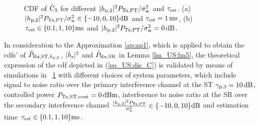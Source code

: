 \begin{figure}[!ht]
{\label{fig_US:CDF_C1_s}}
\hfil
{}
\vspace{0.3cm}
\caption{CDF of $\hat{\text{{C}}}_{\text{3}}$ for different $|h_{\text{p,2}}|^2 P_{\text{Tx,PT}}/\sigma^2_{\text{w}}$ and $\tau_{\text{est}}$. (a) $|h_{\text{p,2}}|^2 P_{\text{Tx,PT}}/\sigma^2_{\text{w}} \in \{-10, 0, 10\} \SI{}{dB}$ and $\tau_{\text{est}} = \SI{1}{ms}$, (b) $\tau_{\text{est}} \in \{0.1, 1, 10\} \SI{}{ms}$ and $|h_{\text{p,2}}|^2 P_{\text{Tx,PT}}/\sigma^2_{\text{w}} = \SI{0}{dB}$.}%
\label{fig_US:CDF_eca}
\vspace{-0.5cm}
\end{figure}
In consideration to the Approximation \ref{ap:ap1}, which is applied to obtain the cdfs' of $\hat{P}_{\text{Rx,ST,$h_{\text{p,3}}$}}$, $|\hat{h}_{\text{s}}|^2$ and $\hat{P}_{\text{Rx,SR}}$ in Lemma \ref{lm_US:lm5}, the theoretical expression of the cdf depicted in (\ref{eq_US:dis_C}) is validated by means of simulations in \figurename~\ref{fig_US:CDF_eca} with different choices of system parameters, which include signal to noise ratio over the primary interference channel at the ST ${\gamma}_{\text{p,3}} = \SI{10}{dB}$, controlled power $P_{\text{Tx,ST,cont}} = \SI{0}{dBm}$, interference to noise ratio at the SR over the secondary interference channel $\frac{|h_{\text{p,2}}|^2 P_{\text{Tx,PT}}}{\sigma^2_{\text{w}}} \in \{-10, 0, 10\} \SI{}{dB}$ and estimation time $\tau_{\text{est}} \in \{0.1, 1, 10\} \SI{}{ms}$.

